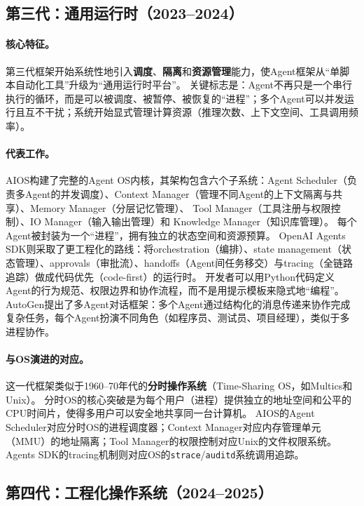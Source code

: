 \subsection{第三代：通用运行时（2023--2024）}

\paragraph{核心特征。}
第三代框架开始系统性地引入\textbf{调度}、\textbf{隔离}和\textbf{资源管理}能力，使Agent框架从``单脚本自动化工具''升级为``通用运行时平台''。
关键标志是：Agent不再只是一个串行执行的循环，而是可以被调度、被暂停、被恢复的``进程''；多个Agent可以并发运行且互不干扰；系统开始显式管理计算资源（推理次数、上下文空间、工具调用频率）。

\paragraph{代表工作。}
AIOS\cite{mei2024aios}构建了完整的Agent OS内核，其架构包含六个子系统：Agent Scheduler（负责多Agent的并发调度）、Context Manager（管理不同Agent的上下文隔离与共享）、Memory Manager（分层记忆管理）、 Tool Manager（工具注册与权限控制）、IO Manager（输入输出管理）和 Knowledge Manager（知识库管理）。
每个Agent被封装为一个``进程''，拥有独立的状态空间和资源预算。
OpenAI Agents SDK\cite{openai_codex_agentsdk_2026}则采取了更工程化的路线：将orchestration（编排）、state management（状态管理）、approvals（审批流）、handoffs（Agent间任务移交）与tracing（全链路追踪）做成代码优先（code-first）的运行时。
开发者可以用Python代码定义Agent的行为规范、权限边界和协作流程，而不是用提示模板来隐式地``编程''。
AutoGen\cite{wu2023autogen}提出了多Agent对话框架：多个Agent通过结构化的消息传递来协作完成复杂任务，每个Agent扮演不同角色（如程序员、测试员、项目经理），类似于多进程协作。

\paragraph{与OS演进的对应。}
这一代框架类似于1960--70年代的\textbf{分时操作系统}（Time-Sharing OS，如Multics和Unix）。
分时OS的核心突破是为每个用户（进程）提供独立的地址空间和公平的CPU时间片，使得多用户可以安全地共享同一台计算机。
AIOS的Agent Scheduler对应分时OS的进程调度器；Context Manager对应内存管理单元（MMU）的地址隔离；Tool Manager的权限控制对应Unix的文件权限系统。
Agents SDK的tracing机制则对应OS的\texttt{strace}/\texttt{auditd}系统调用追踪。

\subsection{第四代：工程化操作系统（2024--2025）}

